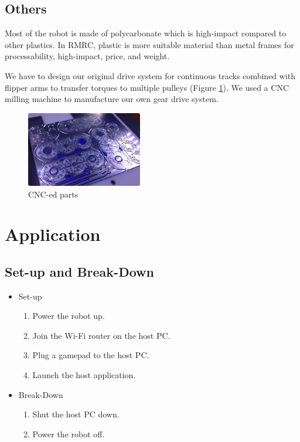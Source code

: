 \documentclass[journal]{IEEEtran}
\begin{document}
\subsection{Others}
Most of the robot is made of polycarbonate which is high-impact compared to other plastics.
In RMRC, plastic is more suitable material than metal frames for processability, high-impact, price, and weight.

We have to design our original drive system for continuous tracks combined with flipper arms to transfer torques to multiple pulleys (Figure \ref{fig:cnc}).
We used a CNC milling machine to manufacture our own gear drive system.
\begin{figure}[!t]
    \centering
    \includegraphics[width=0.45\textwidth]{CNC_milling_parts.png}
    \caption{CNC-ed parts} \label{fig:cnc}
\end{figure}

\section{Application}
\subsection{Set-up and Break-Down}
\begin{itemize}
    \item Set-up
    \begin{enumerate}
        \item Power the robot up.
        \item Join the Wi-Fi router on the host PC.
        \item Plug a gamepad to the host PC.
        \item Launch the host application.
    \end{enumerate}
    \item Break-Down
    \begin{enumerate}
        \item Shut the host PC down.
        \item Power the robot off.
    \end{enumerate}
\end{itemize}
\end{document}
